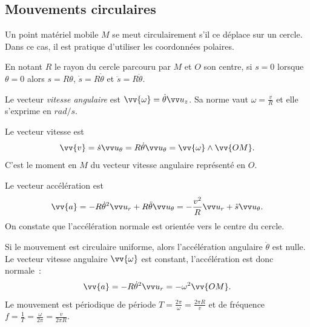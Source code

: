 \subsection{Mouvements circulaires}
\label{chap1-subsec:mvtcirc}


    

Un point matériel mobile $M$ se meut circulairement s'il ce déplace sur un cercle. Dans ce cas, il est pratique d'utiliser les coordonnées polaires.

En notant $R$ le rayon du cercle parcouru par $M$ et $O$ son centre, si $s=0$ lorsque $\theta=0$ alors $s=R\theta$, $\dot{s}=R\dot{\theta}$ et $\ddot{s}=R\ddot{\theta}$.

Le vecteur \emph{vitesse angulaire} est $\vv{\omega}=\dot{\theta}\uz$. Sa norme vaut $\omega=\frac{v}{R}$ et elle s'exprime en $\si{rad\per s}$. 

Le vecteur vitesse est 
\begin{equation}
 \vv{v}=\dot{s}\utheta=R\dot{\theta} \utheta= \vv{\omega} \wedge \vv{OM}.
\end{equation}
C'est le moment en $M$ du vecteur vitesse angulaire représenté en $O$.

Le vecteur accélération est
\begin{equation}
\vv{a}=-R\dot{\theta}^2\ur +R\ddot{\theta}\utheta=-\frac{v^2}{R}\ur+\ddot{s}\utheta.  
\end{equation}
On constate que l'accélération normale est orientée vers le centre du cercle.

Si le mouvement est circulaire uniforme, alors l'accélération angulaire $\ddot{\theta}$ est nulle. Le vecteur vitesse angulaire $\vv{\omega}$ est constant, l'accélération est donc normale~:
\begin{equation}
  \vv{a}=-R\dot{\theta}^2\ur =-\omega^2\vv{OM}.
\end{equation}
Le mouvement est périodique de période $T=\frac{2\pi}{\omega}=\frac{2\pi R}{v}$ et de fréquence $f=\frac{1}{T}=\frac{\omega}{2\pi}=\frac{v}{2\pi R}$.

